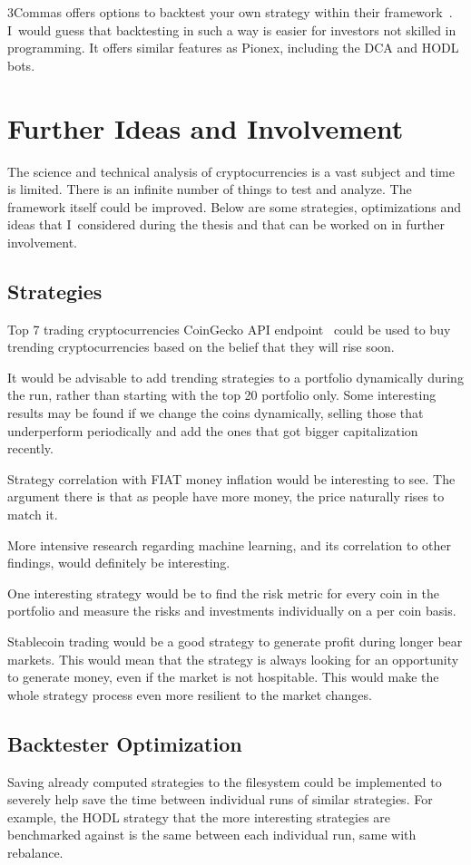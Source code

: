 3Commas offers options to backtest your own strategy within their framework~\cite{3commas-trading-view}. I~would guess that backtesting in such a way is easier for investors not skilled in programming. It offers similar features as Pionex, including the DCA and HODL bots.


\section{Further Ideas and Involvement}
The science and technical analysis of cryptocurrencies is a vast subject and time is limited. There is an infinite number of things to test and analyze. The framework itself could be improved. Below are some strategies, optimizations and ideas that I~considered during the thesis and that can be worked on in further involvement.

\subsection*{Strategies}
Top 7 trading cryptocurrencies CoinGecko API endpoint~\cite{coingecko:documentation} could be used to buy trending cryptocurrencies based on the belief that they will rise soon.

It would be advisable to add trending strategies to a portfolio dynamically during the run, rather than starting with the top 20 portfolio only. Some interesting results may be found if we change the coins dynamically, selling those that underperform periodically and add the ones that got bigger capitalization recently.

Strategy correlation with FIAT money inflation would be interesting to see. The argument there is that as people have more money, the price naturally rises to match it.

More intensive research regarding machine learning, and its correlation to other findings, would definitely be interesting.

One interesting strategy would be to find the risk metric for every coin in the portfolio and measure the risks and investments individually on a per coin basis.

Stablecoin trading would be a good strategy to generate profit during longer bear markets. This would mean that the strategy is always looking for an opportunity to generate money, even if the market is not hospitable. This would make the whole strategy process even more resilient to the market changes.

\subsection*{Backtester Optimization}
Saving already computed strategies to the filesystem could be implemented to severely help save the time between individual runs of similar strategies. For example, the HODL strategy that the more interesting strategies are benchmarked against is the same between each individual run, same with rebalance.

